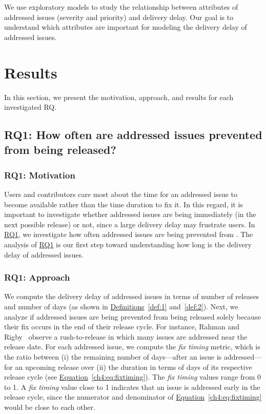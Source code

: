 We use exploratory models to study the relationship between attributes of
addressed issues (\eg severity and priority) and delivery delay. Our goal is to
understand which attributes are important for modeling the delivery delay of
addressed issues. \\

\section{Results} \label{ch3:results}

In this section, we present the motivation, approach, and results for each
investigated RQ. 

\subsection{RQ1: How often are addressed issues prevented
from being released?}\label{ch4:rq1}

\subsubsection*{RQ1: Motivation}

Users and contributors care most about the time for an addressed issue to become
available rather than the time duration to fix it. In this regard, it is
important to investigate whether addressed issues are being \DIFdelbegin {}\DIFdelend \DIFaddbegin {}\DIFaddend immediately (\eg in the next possible release) or not, since a large delivery
delay may frustrate users. In \hyperref[ch:rq1]{RQ1}, we investigate how often
addressed issues are being prevented from \DIFdelbegin {}\DIFdelend \DIFaddbegin {}\DIFaddend . The analysis of
\hyperref[ch:rq1]{RQ1} is our first step toward understanding how long is the
delivery delay of addressed issues.

\subsubsection*{RQ1: Approach} 

We compute the delivery delay of addressed issues in terms of number of releases
and number of days (as shown in \hyperref[def:1]{Definitions}~\ref{def:1}
and~\ref{def:2}). Next, we analyze if addressed issues are being prevented from
being released solely because their fix occurs in the end of their release
cycle. For instance, Rahman and Rigby~\cite{rahman2015release} observe a
rush-to-release in which many issues are addressed near the release date. For
each addressed issue, we compute the {\em fix timing} metric, which is the ratio
between (i) the remaining number of days---after an issue is addressed---for an
upcoming release over (ii) the duration in terms of days of its respective
release cycle (see
\hyperref[ch4:eq:fixtiming]{Equation}~\ref{ch4:eq:fixtiming}). The {\em fix
timing} values range from 0 to 1. A {\em fix timing} value close to 1 indicates
that an issue is addressed early in the release cycle, since the numerator and
denominator of \hyperref[ch4:eq:fixtiming]{Equation}~\ref{ch4:eq:fixtiming}
would be close to each other.

